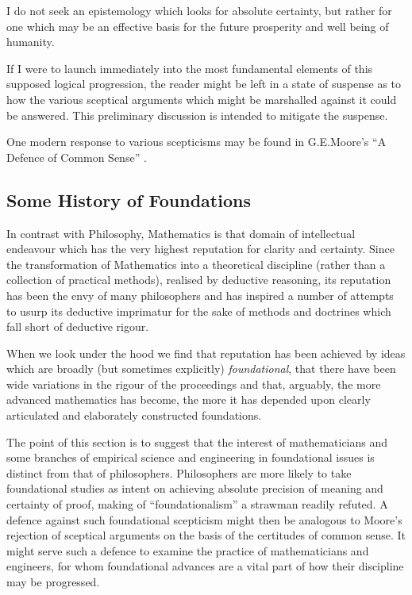 \documentclass[10pt,titlepage]{book}
\begin{document}
I do not seek an epistemology which looks for absolute certainty, but rather for one which may be an effective basis for the future prosperity and well being of humanity.

If I were to launch immediately into the most fundamental elements of this supposed logical progression, the reader might be left in a state of suspense as to how the various sceptical arguments which might be marshalled against it could be answered.
This preliminary discussion is intended to mitigate the suspense.

One modern response to various scepticisms may be found in G.E.Moore's ``A Defence of Common Sense'' \cite{moore1925,moore1993}.

\subsection{Some History of Foundations}

In contrast with Philosophy, Mathematics is that domain of intellectual endeavour which has the very highest reputation for clarity and certainty.
Since the transformation of Mathematics into a theoretical discipline (rather than a collection of practical methods), realised by deductive reasoning, its reputation has been the envy of many philosophers and has inspired a number of attempts to usurp its deductive imprimatur for the sake of methods and doctrines which fall short of deductive rigour.

When we look under the hood we find that reputation has been achieved by ideas which are broadly (but sometimes explicitly) \emph{foundational}, that there have been wide variations in the rigour of the proceedings and that, arguably, the more advanced mathematics has become, the more it has depended upon clearly articulated and elaborately constructed foundations.

The point of this section is to suggest that the interest of mathematicians and some branches of empirical science and engineering in foundational issues is distinct from that of philosophers.
Philosophers are more likely to take foundational studies as intent on achieving absolute precision of meaning and certainty of proof, making of ``foundationalism'' a strawman readily refuted.
A defence against such foundational scepticism might then be analogous to Moore's rejection of sceptical arguments on the basis of the certitudes of common sense.
It might serve such a defence to examine the practice of mathematicians and engineers, for whom foundational advances are a vital part of how their discipline may be progressed.
\end{document}
